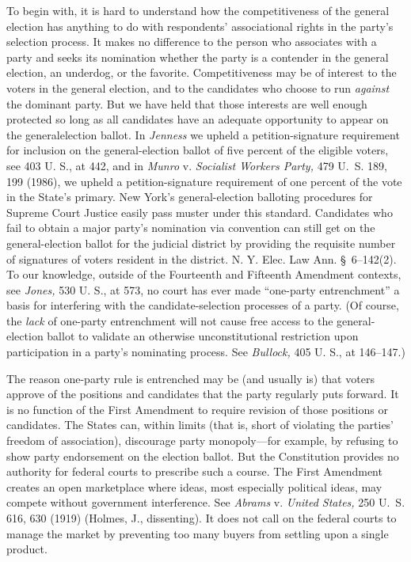   To begin with, it is hard to understand how the competitiveness of the general election has anything to do with respondents' associational rights in the party's selection process. It makes no difference to the person who associates with a party and seeks its nomination whether the party is a contender in the general election, an underdog, or the favorite. Competitiveness may be of interest to the voters in the general election, and to the candidates who choose to run \emph{against} the dominant party. But we have held that those interests are well enough protected so long as all candidates have an adequate opportunity to appear on the generalelection ballot. In \emph{Jenness} we upheld a petition-signature requirement for inclusion on the general-election ballot of five percent of the eligible voters, see 403 U. S., at 442, and in \emph{Munro} v. \emph{Socialist Workers Party,} 479 U.~S. 189, 199 (1986), we upheld a petition-signature requirement of one percent of the vote in the State's primary. New York's general-election balloting procedures for Supreme Court Justice easily pass muster under this standard. Candidates who fail to obtain a major party's nomination via convention can still get on the general-election ballot for the judicial \newpage  district by providing the requisite number of signatures of voters resident in the district. N. Y. Elec. Law Ann. \S~6--142(2). To our knowledge, outside of the Fourteenth and Fifteenth Amendment contexts, see \emph{Jones,} 530 U. S., at 573, no court has ever made ``one-party entrenchment'' a basis for interfering with the candidate-selection processes of a party. (Of course, the \emph{lack} of one-party entrenchment will not cause free access to the general-election ballot to validate an otherwise unconstitutional restriction upon participation in a party's nominating process. See \emph{Bullock,} 405 U. S., at 146--147.)

  The reason one-party rule is entrenched may be (and usually is) that voters approve of the positions and candidates that the party regularly puts forward. It is no function of the First Amendment to require revision of those positions or candidates. The States can, within limits (that is, short of violating the parties' freedom of association), discourage party monopoly---for example, by refusing to show party endorsement on the election ballot. But the Constitution provides no authority for federal courts to prescribe such a course. The First Amendment creates an open marketplace where ideas, most especially political ideas, may compete without government interference. See \emph{Abrams} v. \emph{United States,} 250 U.~S. 616, 630 (1919) (Holmes, J., dissenting). It does not call on the federal courts to manage the market by preventing too many buyers from settling upon a single product.

